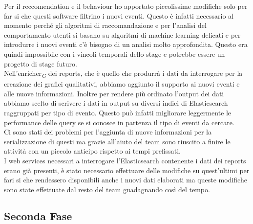 \documentclass[a4paper, 12pt, twoside, openright]{book}
\newcommand{\gloss}[1]{#1\textsubscript{\textit{\tiny{G}}}}
\begin{document}
Per il reccomendation e il behaviour ho apportato piccolissime modifiche solo per far si che questi software filtrino i nuovi eventi. Questo è infatti necessario al momento perché gli algoritmi di raccomandazione e per l'analisi del comportamento utenti si basano su algoritmi di machine learning delicati e per introdurre i nuovi eventi c'è bisogno di un analisi molto approfondita. Questo era quindi impossibile con i vincoli temporali dello stage e potrebbe essere un progetto di stage futuro.\\
Nell'\gloss{enricher} dei reports, che è quello che produrrà i dati da interrogare per la creazione dei grafici qualitativi, abbiamo aggiunto il supporto ai nuovi eventi e alle nuove informazioni. Inoltre per rendere più ordinato l'output dei dati abbiamo scelto di scrivere i dati in output su diversi indici di Elasticsearch raggruppati per tipo di evento. Questo può infatti migliorare leggermente le performance delle query se si conosce in partenza il tipo di eventi da cercare.\\
Ci sono stati dei problemi per l'aggiunta di nuove informazioni per la serializzazione di questi ma grazie all'aiuto del team sono riuscito a finire le attività con un piccolo anticipo rispetto ai tempi prefissati.\\
I web services necessari a interrogare l'Elasticsearch contenente i dati dei reports erano già presenti, è stato necessario effettuare delle modifiche su quest'ultimi per fari si che rendessero disponibili anche i nuovi dati elaborati ma queste modifiche sono state effettuate dal resto del team guadagnando così del tempo.\\

\subsection{Seconda Fase}
\end{document}
